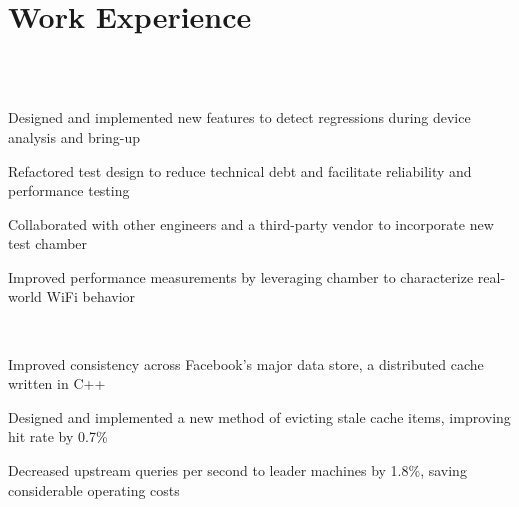 \documentclass[]{resume-style}
\begin{document}
\vspace{-1mm}

\section{\hfill Work Experience \hfill}

\vspace{3mm} 
\\

 \\
\vspace{0.5mm}
\begin{tightemize}
\vspace{0.1mm}
\item Designed and implemented new features to detect regressions during device analysis and bring-up
\item Refactored test design to reduce technical debt and facilitate reliability and performance testing
\item Collaborated with other engineers and a third-party vendor to incorporate new test chamber
\item Improved performance measurements by leveraging chamber to characterize real-world WiFi behavior
\end{tightemize}
\vspace{2mm}
\vspace{0.25mm}
 \\
\vspace{1.5mm}
\begin{tightemize}
\vspace{-1.0mm}
\item Improved consistency across Facebook's major data store, a distributed cache written in C++
\item Designed and implemented a new method of evicting stale cache items, improving hit rate by 0.7\%
\item Decreased upstream queries per second to leader machines by 1.8\%, saving considerable operating costs
\end{tightemize}
\end{document}
